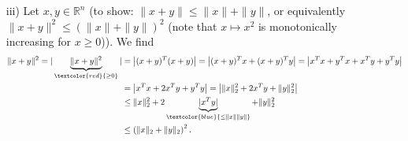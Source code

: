 {\begin{enumerate}
\begin{align*}
		\|{\lambda x}\|_2=\sqrt{\sum_{i=1}^{n}\underbrace{(\lambda x_i)^2}_{\textcolor{blue}{\lambda^2x_i^2}}}=\sqrt{\lambda^2\sum_{i=1}^{n}x_i^2}=\sqrt{\lambda^2}\sqrt{\sum_{i=1}^{n}x_i^2}=|\lambda|\cdot\|{x}\|_2.
		\end{align*}
		\item[iii)] 
		Let $x,y\in\mathbb{R}^n$ (to show: $\|{x+y}\|\leq\|{x}\|+\|{y}\|$, or equivalently $\|{x+y}\|^2\leq(\|{x}\|+\|{y}\|)^2$ (note that $x \mapsto x^2$ is monotonically increasing for $x\geq 0$)). We find
		\begin{align*}\|{x+y}\|^2=| \underbrace{\|{x+y}\|^2}_{\textcolor{red}{\geq0}}| 
		&=\left|(x+y)^T(x+y)\right|=\left|(x+y)^Tx+(x+y)^Ty\right|=\left|x^Tx+y^Tx+x^Ty+y^Ty\right|\\&=\left|x^Tx+2x^Ty+y^Ty\right|=\left|\|{x}\|_2^2+2x^Ty+\|{y}\|_2^2\right|\\
		&\leq \|{x}\|_2^2 +2\underbrace{|x^Ty|}_{\textcolor{blue}{\leq\|{x}\|\|{y}\|}}+\|{y}\|_2^2\\
		&\leq\left(\|{x}\|_2+\|{y}\|_2\right)^2.
		\end{align*}
\end{enumerate}
}
